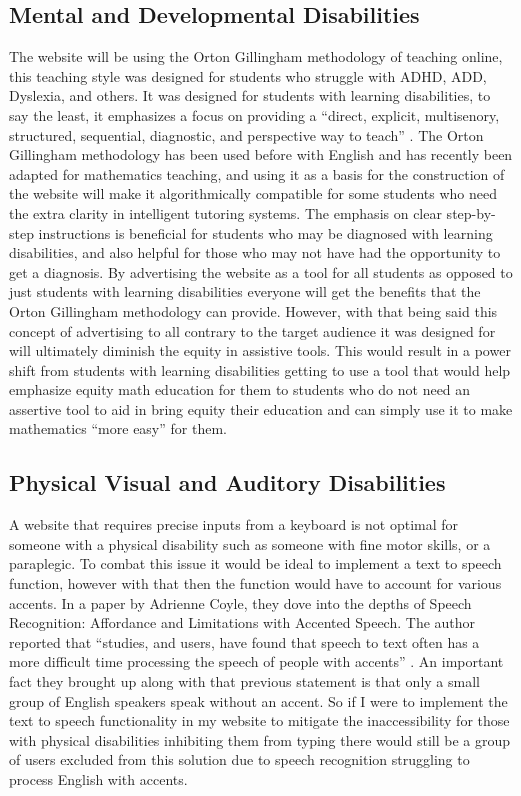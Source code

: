 \documentclass[10pt,twocolumn]{article}
\begin{document}
\subsection{Mental and Developmental Disabilities}
The website will be using the Orton Gillingham methodology of teaching online, this teaching style was designed for students who struggle with ADHD, ADD, Dyslexia, and others. It was designed for students with learning disabilities, to say the least, it emphasizes a focus on providing a “direct, explicit, multisenory, structured, sequential, diagnostic, and perspective way to teach” \cite{ahearn_what_2016}\cite{noauthor_is_nodate}. The Orton Gillingham methodology has been used before with English and has recently been adapted for mathematics teaching, and using it as a basis for the construction of the website will make it algorithmically compatible for some students who need the extra clarity in intelligent tutoring systems. The emphasis on clear step-by-step instructions is beneficial for students who may be diagnosed with learning disabilities, and also helpful for those who may not have had the opportunity to get a diagnosis. By advertising the website as a tool for all students as opposed to just students with learning disabilities everyone will get the benefits that the Orton Gillingham methodology can provide. However, with that being said this concept of advertising to all contrary to the target audience it was designed for will ultimately diminish the equity in assistive tools. This would result in a power shift from students with learning disabilities getting to use a tool that would help emphasize equity math education for them to students who do not need an assertive tool to aid in bring equity their education and can simply use it to make mathematics “more easy” for them.  

\subsection{Physical Visual and Auditory Disabilities}
A website that requires precise inputs from a keyboard is not optimal for someone with a physical disability such as someone with fine motor skills, or a paraplegic. To combat this issue it would be ideal to implement a text to speech function, however with that then the function would have to account for various accents. In a paper by Adrienne Coyle, they dove into the depths of Speech Recognition: Affordance and Limitations with Accented Speech. The author reported that “studies, and users, have found that speech to text often has a more difficult time processing the speech of people with accents” \cite{coyle_final_nodate}.  An important fact they brought up along with that previous statement is that only a small group of English speakers speak without an accent. So if I were to implement the text to speech functionality in my website to mitigate the inaccessibility for those with physical disabilities inhibiting them from typing there would still be a group of users excluded from this solution due to speech recognition struggling to process English with accents.  
\end{document}
